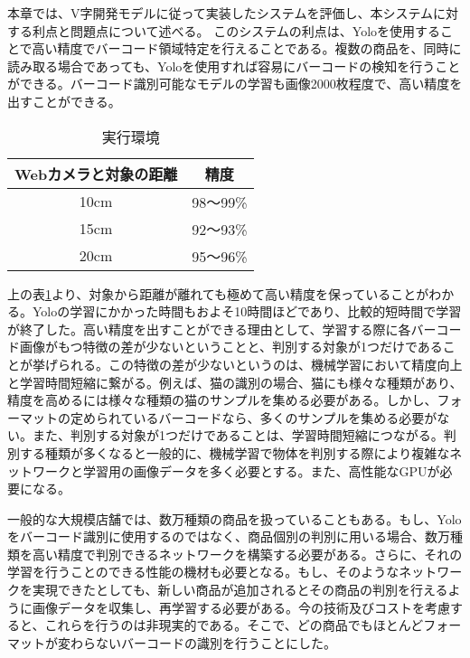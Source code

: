 本章では、V字開発モデルに従って実装したシステムを評価し、本システムに対する利点と問題点について述べる。
このシステムの利点は、Yoloを使用することで高い精度でバーコード領域特定を行えることである。複数の商品を、同時に読み取る場合であっても、Yoloを使用すれば容易にバーコードの検知を行うことができる。バーコード識別可能なモデルの学習も画像2000枚程度で、高い精度を出すことができる。

\begin{table}[htb]
\begin{center}
\caption{実行環境}
\begin{tabular}{|c|c|} \hline
Webカメラと対象の距離 & 精度\\ \hline
10cm & 98～99\% \\ \hline
15cm & 92～93\% \\ \hline
20cm & 95～96\% \\ \hline
\end{tabular}
\label{accurancy}
	\end{center}
\end{table}

上の表\ref{accurancy}より、対象から距離が離れても極めて高い精度を保っていることがわかる。Yoloの学習にかかった時間もおよそ10時間ほどであり、比較的短時間で学習が終了した。高い精度を出すことができる理由として、学習する際に各バーコード画像がもつ特徴の差が少ないということと、判別する対象が1つだけであることが挙げられる。この特徴の差が少ないというのは、機械学習において精度向上と学習時間短縮に繋がる\cite{deep_learning}。例えば、猫の識別の場合、猫にも様々な種類があり、精度を高めるには様々な種類の猫のサンプルを集める必要がある。しかし、フォーマットの定められているバーコードなら、多くのサンプルを集める必要がない。また、判別する対象が1つだけであることは、学習時間短縮につながる。判別する種類が多くなると一般的\cite{deep_learning}に、機械学習で物体を判別する際により複雑なネットワークと学習用の画像データを多く必要とする。また、高性能なGPUが必要になる。

一般的な大規模店舗では、数万種類の商品を扱っていることもある。もし、Yoloをバーコード識別に使用するのではなく、商品個別の判別に用いる場合、数万種類を高い精度で判別できるネットワークを構築する必要がある。さらに、それの学習を行うことのできる性能の機材も必要となる。もし、そのようなネットワークを実現できたとしても、新しい商品が追加されるとその商品の判別を行えるように画像データを収集し、再学習する必要がある。今の技術及びコストを考慮すると、これらを行うのは非現実的である。そこで、どの商品でもほとんどフォーマットが変わらないバーコードの識別を行うことにした。

